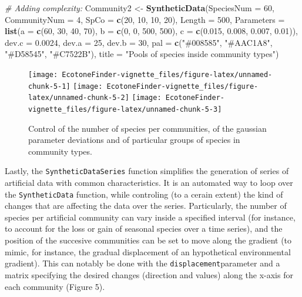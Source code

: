 \documentclass[
]{article}
\newenvironment{Shaded}{\begin{snugshade}}{\end{snugshade}}
\newcommand{\CommentTok}[1]{\textcolor[rgb]{0.56,0.35,0.01}{\textit{#1}}}
\newcommand{\DataTypeTok}[1]{\textcolor[rgb]{0.13,0.29,0.53}{#1}}
\newcommand{\DecValTok}[1]{\textcolor[rgb]{0.00,0.00,0.81}{#1}}
\newcommand{\FloatTok}[1]{\textcolor[rgb]{0.00,0.00,0.81}{#1}}
\newcommand{\KeywordTok}[1]{\textcolor[rgb]{0.13,0.29,0.53}{\textbf{#1}}}
\newcommand{\NormalTok}[1]{#1}
\newcommand{\StringTok}[1]{\textcolor[rgb]{0.31,0.60,0.02}{#1}}
\begin{document}
\begin{Shaded}
\begin{Highlighting}[]
\CommentTok{\# Adding complexity:}
\NormalTok{Community2 \textless{}{-}}\StringTok{ }\KeywordTok{SyntheticData}\NormalTok{(}\DataTypeTok{SpeciesNum =} \DecValTok{60}\NormalTok{, }\DataTypeTok{CommunityNum =} \DecValTok{4}\NormalTok{, }\DataTypeTok{SpCo =} \KeywordTok{c}\NormalTok{(}\DecValTok{20}\NormalTok{, }
    \DecValTok{10}\NormalTok{, }\DecValTok{10}\NormalTok{, }\DecValTok{20}\NormalTok{), }\DataTypeTok{Length =} \DecValTok{500}\NormalTok{, }\DataTypeTok{Parameters =} \KeywordTok{list}\NormalTok{(}\DataTypeTok{a =} \KeywordTok{c}\NormalTok{(}\DecValTok{60}\NormalTok{, }\DecValTok{30}\NormalTok{, }\DecValTok{40}\NormalTok{, }\DecValTok{70}\NormalTok{), }
    \DataTypeTok{b =} \KeywordTok{c}\NormalTok{(}\DecValTok{0}\NormalTok{, }\DecValTok{0}\NormalTok{, }\DecValTok{500}\NormalTok{, }\DecValTok{500}\NormalTok{), }\DataTypeTok{c =} \KeywordTok{c}\NormalTok{(}\FloatTok{0.015}\NormalTok{, }\FloatTok{0.008}\NormalTok{, }\FloatTok{0.007}\NormalTok{, }\FloatTok{0.01}\NormalTok{)), }\DataTypeTok{dev.c =} \FloatTok{0.0024}\NormalTok{, }
    \DataTypeTok{dev.a =} \DecValTok{25}\NormalTok{, }\DataTypeTok{dev.b =} \DecValTok{30}\NormalTok{, }\DataTypeTok{pal =} \KeywordTok{c}\NormalTok{(}\StringTok{"\#008585"}\NormalTok{, }\StringTok{"\#AAC1A8"}\NormalTok{, }\StringTok{"\#D58545"}\NormalTok{, }\StringTok{"\#C7522B"}\NormalTok{), }
    \DataTypeTok{title =} \StringTok{"Pools of species inside community types"}\NormalTok{)}
\end{Highlighting}
\end{Shaded}

\begin{figure}
\texttt{[image: EcotoneFinder-vignette\_files/figure-latex/unnamed-chunk-5-1]} \texttt{[image: EcotoneFinder-vignette\_files/figure-latex/unnamed-chunk-5-2]} \texttt{[image: EcotoneFinder-vignette\_files/figure-latex/unnamed-chunk-5-3]} \caption{Control of the number of species per communities, of the gaussian parameter deviations and of particular groups of species in community types.}\label{fig:unnamed-chunk-5}
\end{figure}

Lastly, the \texttt{SyntheticDataSeries} function simplifies the
generation of series of artificial data with common characteristics. It
is an automated way to loop over the \texttt{SyntheticData} function,
while controling (to a cerain extent) the kind of changes that are
affecting the data over the series. Particularly, the number of species
per artificial community can vary inside a specified interval (for
instance, to account for the loss or gain of seasonal species over a
time series), and the position of the succesive communities can be set
to move along the gradient (to mimic, for instance, the gradual
displacement of an hypothetical environmental gradient). This can
notably be done with the \texttt{displacement}parameter and a matrix
specifying the desired changes (direction and values) along the x-axis
for each community (Figure 5).
\end{document}
